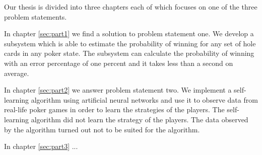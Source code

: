 Our thesis is divided into three chapters each of which focuses on one of the three problem statements.

In chapter \ref{sec:part1} we find a solution to problem statement one. We develop a subsystem which is able to estimate the probability of winning for any set of hole cards in any poker state. The subsystem can calculate the probability of winning with an error percentage of one percent and it takes less than a second on average.

In chapter \ref{sec:part2} we answer problem statement two. We implement a self-learning algorithm using artificial neural networks and use it to observe data from real-life poker games in order to learn the strategies of the players. The self-learning algorithm did not learn the strategy of the players. The data observed by the algorithm turned out not to be suited for the algorithm.

In chapter \ref{sec:part3} ...
